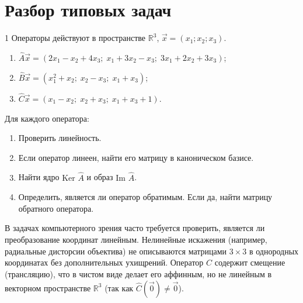\documentclass[12pt,a4paper]{article}
\theoremstyle{plain}
\theoremstyle{definition}
\begin{document}
\vspace{0.3cm}

\section*{Разбор типовых задач}

\begin{taskbox}{1}
    Операторы действуют в пространстве $\mathbb{R}^3$, $\vec{x}=(x_1; x_2; x_3)$.
    \begin{enumerate}[label=\alph*)]
        \item $\hat{A}\vec{x} = (2x_1 - x_2 + 4x_3; \; x_1 + 3x_2 - x_3; \; 3x_1 + 2x_2 + 3x_3)$;
        \item $\hat{B}\vec{x} = (x_1^2 + x_2; \; x_2 - x_3; \; x_1 + x_3)$;
        \item $\hat{C}\vec{x} = (x_1 - x_2; \; x_2 + x_3; \; x_1 + x_3 + 1)$.
    \end{enumerate}
    Для каждого оператора:
    \begin{enumerate}
        \item Проверить линейность.
        \item Если оператор линеен, найти его матрицу в каноническом базисе.
        \item Найти ядро $\text{Ker } \hat{A}$ и образ $\text{Im } \hat{A}$.
        \item Определить, является ли оператор обратимым. Если да, найти матрицу обратного оператора.
    \end{enumerate}
\end{taskbox}

\begin{itbox}
    В задачах компьютерного зрения часто требуется проверить, является ли преобразование координат линейным. Нелинейные искажения (например, радиальные дисторсии объектива) не описываются матрицами $3\times3$ в однородных координатах без дополнительных ухищрений. Оператор $\hat{C}$ содержит смещение (трансляцию), что в чистом виде делает его аффинным, но не линейным в векторном пространстве $\mathbb{R}^3$ (так как $\hat{C}(\vec{0}) \neq \vec{0}$).
\end{itbox}
\end{document}
